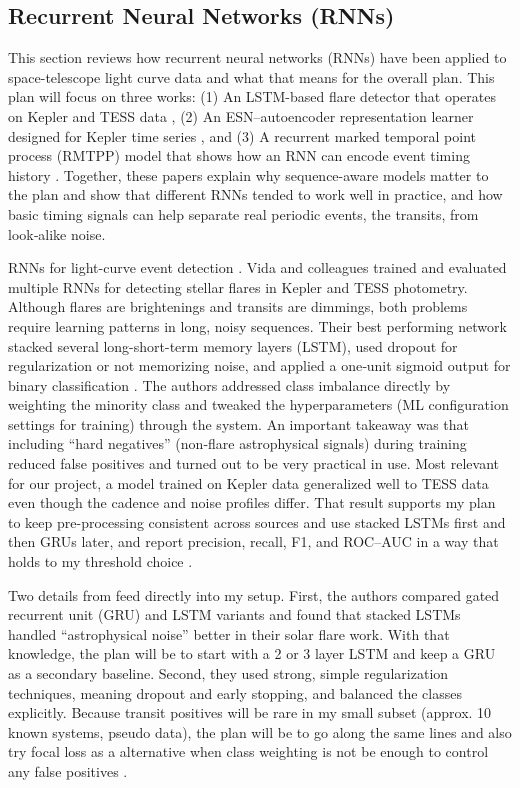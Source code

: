 \documentclass[letterpaper]{article} %
\begin{document}
\subsection{Recurrent Neural Networks (RNNs)}
This section reviews how recurrent neural networks (RNNs) have been applied to space-telescope light curve data and what that means for the overall plan. This plan will focus on three works: (1) An LSTM-based flare detector that operates on Kepler and TESS data \cite{Vida2021findingflaresrecurrent}, (2) An ESN–autoencoder representation learner designed for Kepler time series \cite{kugler2016explorativeapproachkepler}, and (3) A recurrent marked temporal point process (RMTPP) model that shows how an RNN can encode event timing history \cite{Du2016markedtemporalpoint}. Together, these papers explain why sequence-aware models matter to the plan and show that different RNNs tended to work well in practice, and how basic timing signals can help separate real periodic events, the transits, from look‑alike noise.

RNNs for light-curve event detection \cite{Vida2021findingflaresrecurrent}. Vida and colleagues trained and evaluated multiple RNNs for detecting stellar flares in Kepler and TESS photometry. Although flares are brightenings and transits are dimmings, both problems require learning patterns in long, noisy sequences. Their best performing network stacked several long-short-term memory layers (LSTM), used dropout for regularization or not memorizing noise, and applied a one‑unit sigmoid output for binary classification \cite{Vida2021findingflaresrecurrent}. The authors addressed class imbalance directly by weighting the minority class and tweaked the hyperparameters (ML configuration settings for training) through the system. An important takeaway was that including “hard negatives” (non‑flare astrophysical signals) during training reduced false positives and turned out to be very practical in use. Most relevant for our project, a model trained on Kepler data generalized well to TESS data even though the cadence and noise profiles differ. That result supports my plan to keep pre-processing consistent across sources and use stacked LSTMs first and then GRUs later, and report precision, recall, F1, and ROC–AUC in a way that holds to my threshold choice \cite{Vida2021findingflaresrecurrent}.

Two details from \cite{Vida2021findingflaresrecurrent} feed directly into my setup. First, the authors compared gated recurrent unit (GRU) and LSTM variants and found that stacked LSTMs handled “astrophysical noise” better in their solar flare work. With that knowledge, the plan will be to start with a 2 or 3 layer LSTM and keep a GRU as a secondary baseline. Second, they used strong, simple regularization techniques, meaning dropout and early stopping, and balanced the classes explicitly. Because transit positives will be rare in my small subset (approx. 10 known systems, pseudo data), the plan will be to go along the same lines and also try focal loss as a alternative when class weighting is not be enough to control any false positives \cite{Vida2021findingflaresrecurrent}.
\end{document}
